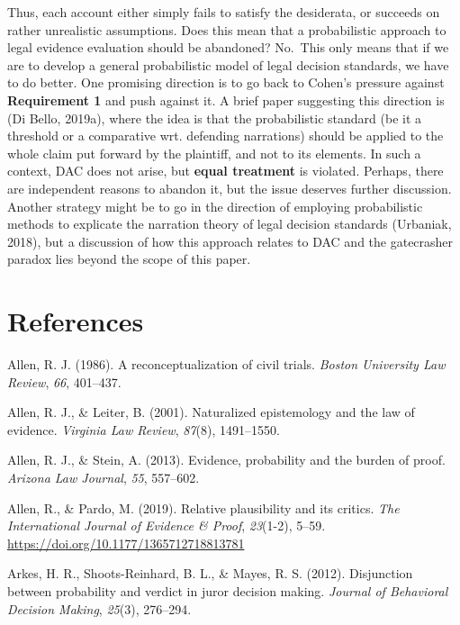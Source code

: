 \documentclass[10pt,dvipsnames,enabledeprecatedfontcommands]{scrartcl}
\begin{document}
Thus, each account either simply fails to satisfy the desiderata, or
succeeds on rather unrealistic assumptions. Does this mean that a
probabilistic approach to legal evidence evaluation should be abandoned?
No.~This only means that if we are to develop a general probabilistic
model of legal decision standards, we have to do better. One promising
direction is to go back to Cohen's pressure against
\textbf{Requirement 1} and push against it. A brief paper suggesting
this direction is (Di Bello, 2019a), where the idea is that the
probabilistic standard (be it a threshold or a comparative wrt.
defending narrations) should be applied to the whole claim put forward
by the plaintiff, and not to its elements. In such a context, DAC does
not arise, but \textbf{equal treatment} is violated. Perhaps, there are
independent reasons to abandon it, but the issue deserves further
discussion. Another strategy might be to go in the direction of
employing probabilistic methods to explicate the narration theory of
legal decision standards (Urbaniak, 2018), but a discussion of how this
approach relates to DAC and the gatecrasher paradox lies beyond the
scope of this paper.

\hypertarget{references}{%
\section*{References}\label{references}}

\hypertarget{refs}{}
\leavevmode\hypertarget{ref-Allen1986A-Reconceptuali}{}%
Allen, R. J. (1986). A reconceptualization of civil trials. \emph{Boston
University Law Review}, \emph{66}, 401--437.

\leavevmode\hypertarget{ref-allen2001naturalized}{}%
Allen, R. J., \& Leiter, B. (2001). Naturalized epistemology and the law
of evidence. \emph{Virginia Law Review}, \emph{87}(8), 1491--1550.

\leavevmode\hypertarget{ref-allen2013}{}%
Allen, R. J., \& Stein, A. (2013). Evidence, probability and the burden
of proof. \emph{Arizona Law Journal}, \emph{55}, 557--602.

\leavevmode\hypertarget{ref-AllenPardo2019relative}{}%
Allen, R., \& Pardo, M. (2019). Relative plausibility and its critics.
\emph{The International Journal of Evidence \& Proof}, \emph{23}(1-2),
5--59. \url{https://doi.org/10.1177/1365712718813781}

\leavevmode\hypertarget{ref-arkesEtAl2012}{}%
Arkes, H. R., Shoots-Reinhard, B. L., \& Mayes, R. S. (2012).
Disjunction between probability and verdict in juror decision making.
\emph{Journal of Behavioral Decision Making}, \emph{25}(3), 276--294.
\end{document}
